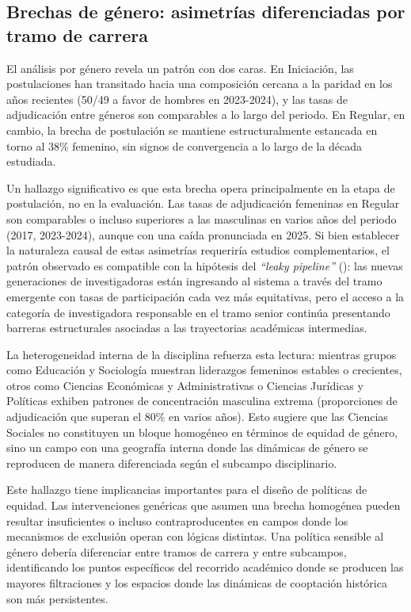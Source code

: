 \documentclass[
  spanish,
  a4paper,
  oneside]{scrbook}
\begin{document}
\subsection{Brechas de género: asimetrías diferenciadas por tramo de
carrera}\label{brechas-de-guxe9nero-asimetruxedas-diferenciadas-por-tramo-de-carrera}

El análisis por género revela un patrón con dos caras. En Iniciación,
las postulaciones han transitado hacia una composición cercana a la
paridad en los años recientes (50/49 a favor de hombres en 2023-2024), y
las tasas de adjudicación entre géneros son comparables a lo largo del
periodo. En Regular, en cambio, la brecha de postulación se mantiene
estructuralmente estancada en torno al 38\% femenino, sin signos de
convergencia a lo largo de la década estudiada.

Un hallazgo significativo es que esta brecha opera principalmente en la
etapa de postulación, no en la evaluación. Las tasas de adjudicación
femeninas en Regular son comparables o incluso superiores a las
masculinas en varios años del periodo (2017, 2023-2024), aunque con una
caída pronunciada en 2025. Si bien establecer la naturaleza causal de
estas asimetrías requeriría estudios complementarios, el patrón
observado es compatible con la hipótesis del \emph{``leaky pipeline''}
(): las
nuevas generaciones de investigadoras están ingresando al sistema a
través del tramo emergente con tasas de participación cada vez más
equitativas, pero el acceso a la categoría de investigadora responsable
en el tramo senior continúa presentando barreras estructurales asociadas
a las trayectorias académicas intermedias.

La heterogeneidad interna de la disciplina refuerza esta lectura:
mientras grupos como Educación y Sociología muestran liderazgos
femeninos estables o crecientes, otros como Ciencias Económicas y
Administrativas o Ciencias Jurídicas y Políticas exhiben patrones de
concentración masculina extrema (proporciones de adjudicación que
superan el 80\% en varios años). Esto sugiere que las Ciencias Sociales
no constituyen un bloque homogéneo en términos de equidad de género,
sino un campo con una geografía interna donde las dinámicas de género se
reproducen de manera diferenciada según el subcampo disciplinario.

Este hallazgo tiene implicancias importantes para el diseño de políticas
de equidad. Las intervenciones genéricas que asumen una brecha homogénea
pueden resultar insuficientes o incluso contraproducentes en campos
donde los mecanismos de exclusión operan con lógicas distintas. Una
política sensible al género debería diferenciar entre tramos de carrera
y entre subcampos, identificando los puntos específicos del recorrido
académico donde se producen las mayores filtraciones y los espacios
donde las dinámicas de cooptación histórica son más persistentes.
\end{document}
